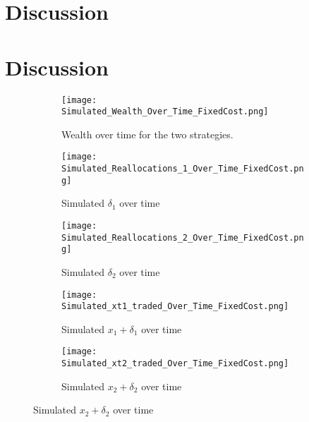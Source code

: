 \documentclass[11pt]{article}
\begin{document}
\fi
\section{Discussion} \label{Section: Discussion}
\section{Discussion} \label{Section: Discussion}
\begin{figure}[!ht]
    \centering
    \begin{subfigure}[t]{0.8\textwidth} %
        \centering
        \texttt{[image: Simulated\_Wealth\_Over\_Time\_FixedCost.png]}
        \caption{Wealth over time for the two strategies.}
    \end{subfigure}

    \vspace{1em} %
    \begin{subfigure}[t]{0.49\textwidth}
        \centering
        \texttt{[image: Simulated\_Reallocations\_1\_Over\_Time\_FixedCost.png]}
        \caption{Simulated $\delta_{1}$ over time}
    \end{subfigure}%
    \hfill
    \begin{subfigure}[t]{0.49\textwidth}
        \centering
        \texttt{[image: Simulated\_Reallocations\_2\_Over\_Time\_FixedCost.png]}
        \caption{Simulated $\delta_{2}$ over time}
    \end{subfigure}

    \vspace{1em} %
    \begin{subfigure}[t]{0.49\textwidth}
        \centering
        \texttt{[image: Simulated\_xt1\_traded\_Over\_Time\_FixedCost.png]}
        \caption{Simulated $x_{1} + \delta_{1}$ over time}
    \end{subfigure}%
    \hfill
    \begin{subfigure}[t]{0.49\textwidth}
        \centering
        \texttt{[image: Simulated\_xt2\_traded\_Over\_Time\_FixedCost.png]}
        \caption{Simulated $x_{2} + \delta_{2}$ over time}
    \end{subfigure}
\end{figure}


\ifdefined\COMPILINGMAIN
\else
\end{document}
